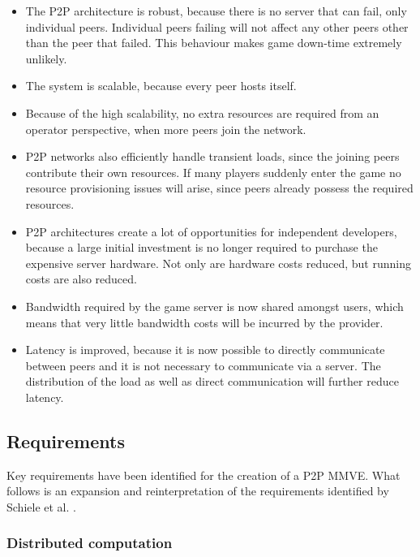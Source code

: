 \begin{itemize}
\item The P2P architecture is robust, because there is no server that can fail, only individual peers. Individual peers failing will not affect any other peers other than the peer that failed. This behaviour makes game down-time extremely unlikely.

\item The system is scalable, because every peer hosts itself.

\item Because of the high scalability, no extra resources are required from an operator perspective, when more peers join the network.

\item P2P networks also efficiently handle transient loads, since the joining peers contribute their own resources. If many players suddenly enter the
game no resource provisioning issues will arise, since peers already possess the required resources.

\item P2P architectures create a lot of opportunities for independent developers, because a large initial investment is no longer required to purchase
the expensive server hardware. Not only are hardware costs reduced, but running costs are also reduced.

\item Bandwidth required by the game server is now shared amongst users, which means that very little bandwidth costs will be incurred by the provider.

\item Latency is improved, because it is now possible to directly communicate between peers and it is not necessary to communicate via a server.
The distribution of the load as well as direct communication will further reduce latency.
\end{itemize}

\subsection{Requirements}

Key requirements have been identified for the creation of a P2P MMVE. What follows is an expansion and reinterpretation of the requirements identified by Schiele et al. \cite{Schiele_p2p_requirements}.

\subsubsection{Distributed computation}
\label{distributed_computation_requirement}

